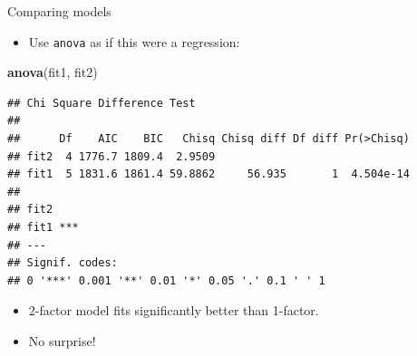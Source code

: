 \documentclass[ignorenonframetext,]{beamer}
\newenvironment{Shaded}{\begin{snugshade}}{\end{snugshade}}
\newcommand{\KeywordTok}[1]{\textcolor[rgb]{0.13,0.29,0.53}{\textbf{#1}}}
\newcommand{\NormalTok}[1]{#1}
\providecommand{\tightlist}{%
  \setlength{\itemsep}{0pt}\setlength{\parskip}{0pt}}
\begin{document}
\begin{frame}[fragile]{Comparing models}
\protect\hypertarget{comparing-models}{}

\begin{itemize}
\tightlist
\item
  Use \texttt{anova} as if this were a regression:
\end{itemize}

\scriptsize

\begin{Shaded}
\begin{Highlighting}[]
\KeywordTok{anova}\NormalTok{(fit1, fit2)}
\end{Highlighting}
\end{Shaded}

\begin{verbatim}
## Chi Square Difference Test
## 
##      Df    AIC    BIC   Chisq Chisq diff Df diff Pr(>Chisq)
## fit2  4 1776.7 1809.4  2.9509                              
## fit1  5 1831.6 1861.4 59.8862     56.935       1  4.504e-14
##         
## fit2    
## fit1 ***
## ---
## Signif. codes:  
## 0 '***' 0.001 '**' 0.01 '*' 0.05 '.' 0.1 ' ' 1
\end{verbatim}

\normalsize

\begin{itemize}
\item
  2-factor model fits significantly better than 1-factor.
\item
  No surprise!
\end{itemize}

\end{frame}
\end{document}
